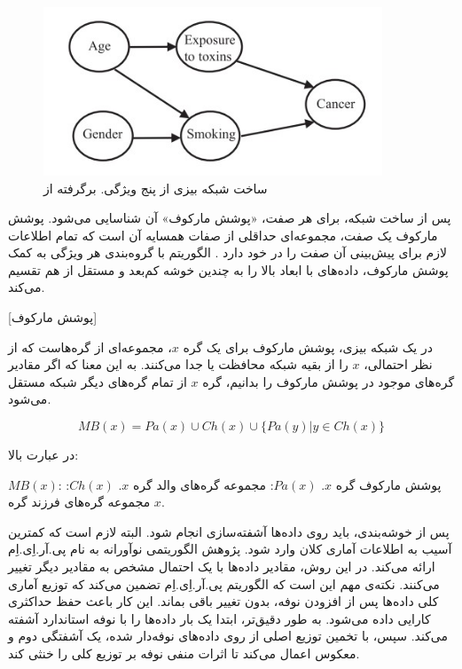 \begin{figure}[h]
  \centering
  \includegraphics[width=0.9\textwidth]{figs/dp2pub_bayesian.jpg}
  \caption{ساخت شبکه بیزی از پنج ویژگی. برگرفته از }
  \label{fig:dp2pub}
\end{figure}

پس از ساخت شبکه، برای هر صفت، «پوشش مارکوف» آن شناسایی می‌شود. پوشش مارکوف یک صفت، مجموعه‌ای حداقلی از صفات همسایه آن است که تمام اطلاعات لازم برای پیش‌بینی آن صفت را در خود دارد . الگوریتم با گروه‌بندی هر ویژگی به کمک پوشش مارکوف، داده‌های با ابعاد بالا را به چندین خوشه کم‌بعد و مستقل از هم تقسیم می‌کند.

[پوشش مارکوف]

در یک شبکه بیزی، پوشش مارکوف برای یک گره $x$، مجموعه‌ای از گره‌هاست که از نظر احتمالی، $x$ را از بقیه شبکه محافظت یا جدا می‌کنند. به این معنا که اگر مقادیر گره‌های موجود در پوشش مارکوف را بدانیم، گره $x$ از تمام گره‌های دیگر شبکه مستقل می‌شود.

\begin{equation}
MB(x) = Pa(x) \cup Ch(x) \cup \{Pa(y)|y \in Ch(x)\}
\end{equation}

در عبارت بالا:

 $MB(x)$: پوشش مارکوف گره $x$.
 $Pa(x)$: مجموعه گره‌های والد گره $x$.
 $Ch(x)$: مجموعه گره‌های فرزند گره $x$.



پس از خوشه‌بندی، باید روی داده‌ها آشفته‌سازی انجام شود. البته لازم است که کمترین آسیب به اطلاعات آماری کلان وارد شود. پژوهش الگوریتمی نوآورانه به نام پی.آر.اِی.اِم ارائه می‌کند. در این روش، مقادیر داده‌ها با یک احتمال مشخص به مقادیر دیگر تغییر می‌کنند. نکته‌ی مهم این است که الگوریتم پی.آر.اِی.اِم تضمین می‌کند که توزیع آماری کلی داده‌ها پس از افزودن نوفه، بدون تغییر باقی بماند. این کار باعث حفظ حداکثری کارایی داده می‌شود. به طور دقیق‌تر، ابتدا یک بار داده‌ها را با نوفه استاندارد آشفته می‌کند. سپس، با تخمین توزیع اصلی از روی داده‌های نوفه‌دار شده، یک آشفتگی دوم و معکوس اعمال می‌کند تا اثرات منفی نوفه بر توزیع کلی را خنثی کند.

